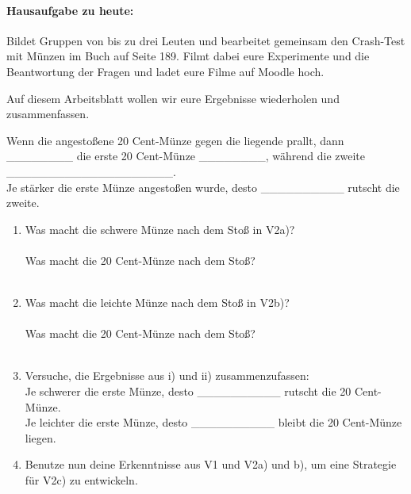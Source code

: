 \documentclass[task=1]{exercise}
\begin{document}
\paragraph{Hausaufgabe zu heute:} Bildet Gruppen von bis zu drei Leuten und bearbeitet gemeinsam den Crash-Test mit M\"unzen im Buch auf Seite 189. Filmt dabei eure Experimente und die Beantwortung der Fragen und ladet eure Filme auf Moodle hoch.

Auf diesem Arbeitsblatt wollen wir eure Ergebnisse wiederholen und zusammenfassen.

  \task[Beobachtung zu V1]
  Wenn die angesto{\ss}ene 20 Cent-M\"unze gegen die liegende prallt, dann \_\_\_\_\_\_\_\_ die erste 20 Cent-M\"unze \_\_\_\_\_\_\_\_, w\"ahrend die zweite \_\_\_\_\_\_\_\_\_\_\_\_\_\_\_\_\_\_\_\_.\\
  Je st\"arker die erste M\"unze angesto{\ss}en wurde, desto \_\_\_\_\_\_\_\_\_\_ rutscht die zweite.
  
  \task[Beobachtung zu V2]
  
  \begin{enumerate}[label=\textnormal{\roman*)}]
   \item Was macht die schwere M\"unze nach dem Sto{\ss} in V2a)?\\\vspace{1cm}\\
   Was macht die 20 Cent-M\"unze nach dem Sto{\ss}?\\\vspace{1cm}\\
   \item Was macht die leichte M\"unze nach dem Sto{\ss} in V2b)?\\\vspace{1cm}\\
   Was macht die 20 Cent-M\"unze nach dem Sto{\ss}?\\\vspace{1cm}\\
   \item\label{item:s} Versuche, die Ergebnisse aus i) und ii) zusammenzufassen:\\
   Je schwerer die erste M\"unze, desto \_\_\_\_\_\_\_\_\_\_ rutscht die 20 Cent-M\"unze.\\
   Je leichter die erste M\"unze, desto \_\_\_\_\_\_\_\_\_\_ bleibt die 20 Cent-M\"unze liegen.
   \item Benutze nun deine Erkenntnisse aus V1 und V2a) und b), um eine Strategie f\"ur V2c) zu entwickeln.\\
   \vspace{3cm}
   \end{enumerate}
   
\end{document}
